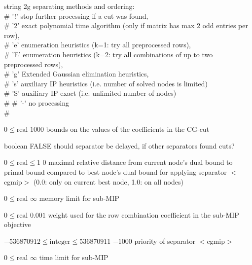 %
{string}%
{2g}%
{separating methods and ordering:\\   \#                      '!' stop further processing if a cut was found,\\   \#                      '2' exact polynomial time algorithm (only if matrix has max 2 odd entries per row),\\   \#                      'e' enumeration heuristics (k=1: try all preprocessed rows),\\   \#                      'E' enumeration heuristics (k=2: try all combinations of up to two preprocessed rows),\\   \#                      'g' Extended Gaussian elimination heuristics,\\   \#                      's' auxiliary IP heuristics (i.e. number of solved nodes is limited)\\   \#                      'S' auxiliary IP exact      (i.e. unlimited number of nodes)\\   \#
   \#                      '-' no processing\\   \#}%
{}

%
{$0\leq\textrm{real}$}%
{$1000$}%
{bounds on the values of the coefficients in the CG-cut}%
{}

%
{boolean}%
{FALSE}%
{should separator be delayed, if other separators found cuts?}%
{}

%
{$0\leq\textrm{real}\leq1$}%
{$0$}%
{maximal relative distance from current node's dual bound to primal bound compared to best node's dual bound for applying separator $<$cgmip$>$ (0.0: only on current best node, 1.0: on all nodes)}%
{}

%
{$0\leq\textrm{real}$}%
{$\infty$}%
{memory limit for sub-MIP}%
{}

%
{$0\leq\textrm{real}$}%
{$0.001$}%
{weight used for the row combination coefficient in the sub-MIP objective}%
{}

%
{$-536870912\leq\textrm{integer}\leq536870911$}%
{$-1000$}%
{priority of separator $<$cgmip$>$}%
{}

%
{$0\leq\textrm{real}$}%
{$\infty$}%
{time limit for sub-MIP}%
{}

